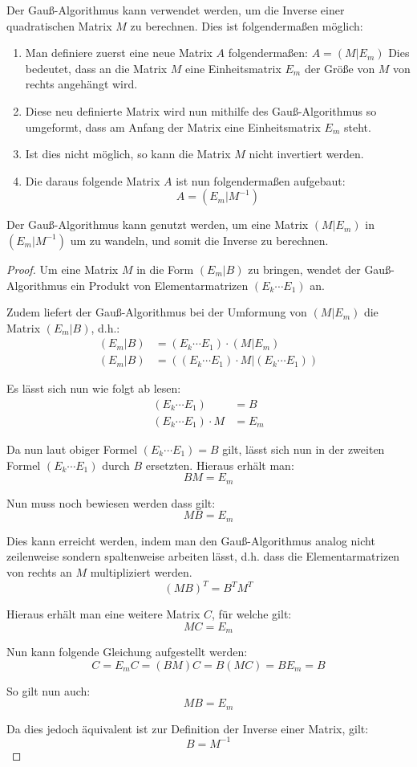 Der Gauß-Algorithmus kann verwendet werden, um die Inverse einer quadratischen Matrix $M$ zu berechnen.
Dies ist folgendermaßen möglich:

\begin{enumerate}
\item Man definiere zuerst eine neue Matrix $A$ folgendermaßen:
$A = (M|E_m)$
Dies bedeutet, dass an die Matrix $M$ eine Einheitsmatrix $E_m$ der Größe von $M$ von rechts angehängt wird. 
\item Diese neu definierte Matrix wird nun mithilfe des Gauß-Algorithmus so umgeformt, dass am Anfang der Matrix eine Einheitsmatrix $E_m$ steht.
\item Ist dies nicht möglich, so kann die Matrix $M$ nicht invertiert werden.
\item Die daraus folgende Matrix $A$ ist nun folgendermaßen aufgebaut: \[ A = (E_m|M^{-1}) \]
\end{enumerate}

\begin{Them}
Der Gauß-Algorithmus kann genutzt werden, um eine Matrix $(M|E_m)$ in $(E_m|M^{-1})$ um zu wandeln, und somit die Inverse zu berechnen.
\end{Them}

\begin{proof}
Um eine Matrix $M$ in die Form $(E_m|B)$ zu bringen, wendet der Gauß-Algorithmus ein Produkt von Elementarmatrizen $(E_k \cdots E_1)$ an.

Zudem liefert der Gauß-Algorithmus bei der Umformung von $(M|E_m)$ die Matrix $(E_m|B)$, d.h.: 
\begin{align*}
  (E_m|B) &= (E_k \cdots E_1) \cdot (M|E_m)\\ 
  (E_m|B) &= ((E_k \cdots E_1) \cdot M | (E_k \cdots E_1))
\end{align*}

Es lässt sich nun wie folgt ab lesen:
\begin{align*}
 (E_k \cdots E_1) &= B \\
(E_k \cdots E_1) \cdot M &= E_m
\end{align*}

Da nun laut obiger Formel $(E_k \cdots E_1) = B$ gilt, lässt sich nun in der zweiten Formel $(E_k \cdots E_1)$ durch $B$ ersetzten. Hieraus erhält man:
\[ B M = E_m \]

Nun muss noch bewiesen werden dass gilt: 
\[ M B = E_m \]

Dies kann erreicht werden, indem man den Gauß-Algorithmus analog nicht zeilenweise sondern spaltenweise arbeiten lässt, d.h. dass die Elementarmatrizen von rechts an $M$ multipliziert werden.
\[ (MB)^T = B^TM^T \]

Hieraus erhält man eine weitere Matrix $C$, für welche gilt:
\[ MC = E_m \]

Nun kann folgende Gleichung aufgestellt werden: 
\[ C = E_mC = (BM)C = B(MC) = BE_m = B \]

So gilt nun auch: 
\[ MB = E_m \]

Da dies jedoch äquivalent ist zur Definition der Inverse einer Matrix, gilt:
\[ B=M^{-1}\]



\end{proof}